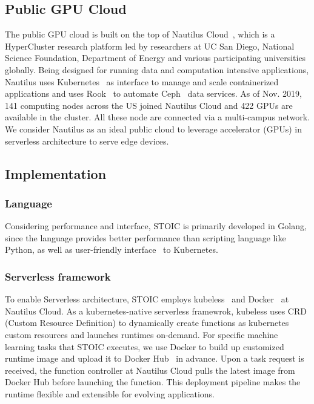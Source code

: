  \subsection{Public GPU Cloud}
 
 The public GPU cloud is built on the top of Nautilus Cloud~\cite{ref:nautilus}, which is a HyperCluster research platform led by researchers at UC San Diego, National Science Foundation, Department of Energy and various participating universities globally. Being designed for running data and computation intensive applications, Nautilus uses Kubernetes~\cite{ref:k8s} as interface to manage and scale containerized applications and uses Rook~\cite{ref:rook} to automate Ceph~\cite{ref:ceph} data services. As of Nov. 2019, 141 computing nodes across the US joined Nautilus Cloud and 422 GPUs are available in the cluster. All these node are connected via a multi-campus network. We consider Nautilus as an ideal public cloud to leverage accelerator (GPUs) in serverless architecture to serve edge devices. 
 
 \subsection{Implementation}
 
 \subsubsection{Language}
 Considering performance and interface, STOIC is primarily developed in Golang, since the language provides better performance than scripting language like Python, as well as user-friendly interface~\cite{ref:client-go} to Kubernetes. 
 
 \BlankLine
 \subsubsection{Serverless framework}
 To enable Serverless architecture, STOIC employs kubeless~\cite{ref:kubeless} and Docker~\cite{ref:docker} at Nautilus Cloud. As a kubernetes-native serverless framewrok, kubeless uses CRD (Custom Resource Definition)\cite{ref:crd} to dynamically create functions as kubernetes custom resources and launches runtimes on-demand. For specific machine learning tasks that STOIC executes, we use Docker to build up customized runtime image and upload it to Docker Hub~\cite{ref:dockerhub} in advance. Upon a task request is received, the function controller at Nautilus Cloud pulls the latest image from Docker Hub before launching the function. This deployment pipeline makes the runtime flexible and extensible for evolving applications. 
 
